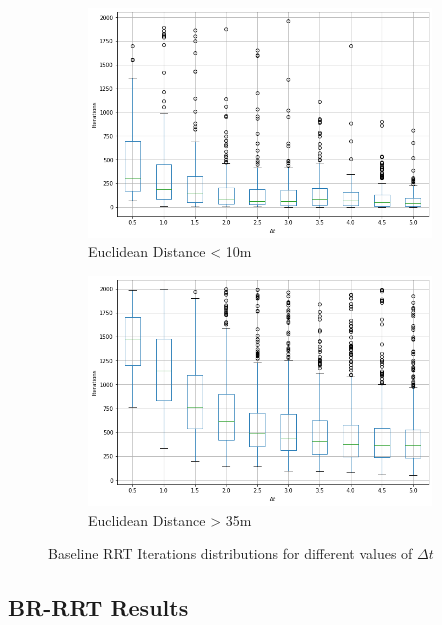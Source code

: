 \documentclass[a4paper,12pt]{article}
\DeclareRobustCommand{\[}{\begin{equation}}
\DeclareRobustCommand{\]}{\end{equation}}
\numberwithin{equation}{section}
\numberwithin{algorithm}{section}
\begin{document}
\begin{figure}[H]
\centering
    \begin{subfigure}[b]{0.6\textwidth}
        \includegraphics[scale=0.7,width=\textwidth]{images/baseline_low_distance_iterations_over_t.png}
        \caption{Euclidean Distance < 10m}
        \label{fig:baseline_edge_len_fail_dist}
    \end{subfigure}
    \begin{subfigure}[b]{0.6\textwidth}
        \includegraphics[scale=0.7,width=\textwidth]{images/baseline_high_distance_iterations_over_t.png}
        \caption{Euclidean Distance > 35m}
    \end{subfigure}
    \caption{Baseline RRT Iterations distributions for different values of $\Delta{t}$}
    \label{fig:baseline_iterations}
\end{figure}

\subsection{BR-RRT Results}
\end{document}
